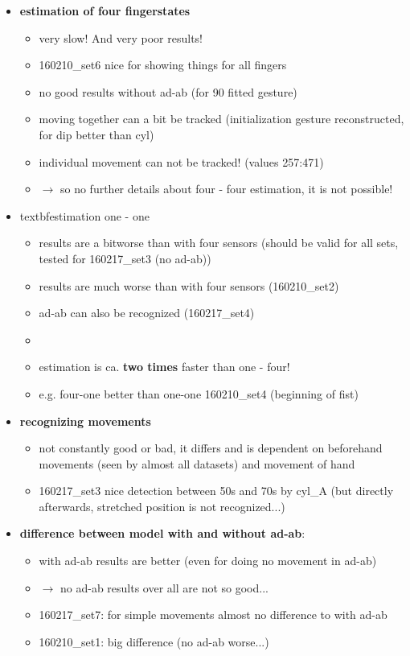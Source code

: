 \begin{itemize}

%
\item \textbf{estimation of four fingerstates}
	\begin{itemize}
	\item very slow! And very poor results!
	\item 160210\_set6 nice for showing things for all fingers
	\item no good results without ad-ab (for 90 fitted gesture)
	\item moving together can a bit be tracked (initialization gesture reconstructed, for dip better than cyl)
	\item individual movement can not be tracked! (values 257:471)
	\item $ \rightarrow $ so no further details about four - four estimation, it is not possible!
	\end{itemize}

\item textbf{estimation one - one}
	\begin{itemize}
	\item results are \grqq a bit\grqq worse than with four sensors (should be valid for all sets, tested for 160217\_set3 (no ad-ab))
	\item results are much worse than with four sensors (160210\_set2)
	\item ad-ab can also be recognized (160217\_set4)
	\item {}
	\item estimation is ca. \textbf{two times} faster than one - four!
	\item e.g. four-one better than one-one 160210\_set4 (beginning of fist)
	\end{itemize}

%
\item \textbf{recognizing movements}
	\begin{itemize}
	\item not constantly \grqq good or bad\grqq, it differs and is dependent on beforehand movements (seen by almost all datasets) and movement of hand
	\item 160217\_set3 nice detection between 50s and 70s by cyl\_A (but directly afterwards, stretched position is not recognized...)
	\end{itemize}


\item \textbf{difference between model with and without ad-ab}:
	\begin{itemize}
	\item with ad-ab results are better (even for doing no movement in ad-ab)
	\item $ \rightarrow $ no ad-ab results over all are not so good...
	\item 160217\_set7: for simple movements almost no difference to with ad-ab
	\item 160210\_set1: big difference (no ad-ab worse...)
	\end{itemize}



\end{itemize}
